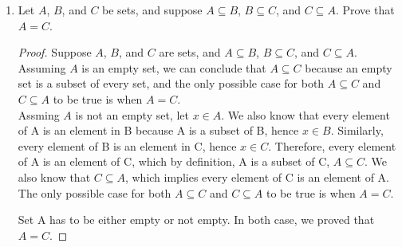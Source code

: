 \documentclass[12pt]{article}
\renewcommand\qedsymbol{$\blacksquare$}
\newenvironment{solution}
{\begin{proof}[Solution]\renewcommand\qedsymbol{$\square$}}
	{\end{proof}}
\begin{document}
\begin{enumerate}
\begin{solution}
		When $n=4$, $x^n= x^4$. Hence, we need to evaluate $\int_0^\infty x^4 e^{-x} dx$. Let $u=x^4 and dv=e^{-x}$, hence we will have $du= d(x^4) = 4x^3$ and $v = \int dv = -e^{-x} $. Using integration by parts, we will have:
	\begin{align*}
		&\int_0^\infty x^4 e^{-x} dx\\
		&= (-x^4 e^{-x} ) \bigg |_0^\infty - \int^\infty_0 -4x^3 e^{-x} dx \\
		&=(0+0) +  4 \int_0^\infty x^3 e^{-x} dx\\
	\end{align*}
	From the last integration, we know that $\int_0^\infty x^3 e^{-x} dx = 6$. Hence the result for $\int_0^\infty x^4 e^{-x} dx$ is $0+4 \times 6=24$.\\
	
		We can observe that when $n=0$, the value is $1=0!$, when $n=1$, the value is $1=1!$, when $n=2$, the value is $2=2!$, when $n=3$, the value is $6=3!$, and  when $n=4$, the value is $24=4!$.	Base on the pattens above, for an arbitary natural number $n$, the value of this integral will be $n!$ When $n=\frac{1}{2}$, the result is $\frac{\sqrt{\pi}}{2}.$ base on the calculator. It is surprising because using the integration, we found the way to evaluate factorial of a fraction(i.e. $\frac{1}{2}!=\frac{\sqrt{\pi}}{2}$).
	  \end{solution}
		
		
		
		
		\item
		Let $A$, $B$, and $C$ be sets, and suppose $A \subseteq B$, $B \subseteq C$, and $C \subseteq A$. Prove that $A = C$.
		\begin{proof}
			Suppose $A$, $B$, and $C$ are sets, and $A \subseteq B$, $B \subseteq C$, and $C \subseteq A$. \\Assuming $A$ is an empty set, we can conclude that $A \subseteq C$ because an empty set is a subset of every set, and the only possible case for both $A \subseteq C$ and $C \subseteq A$ to be true is when $A=C$.\\
			Assming $A$ is not an empty set, let $x \in A$. We also know that every element of A is an element in B because A is a subset of B, hence $x \in B$. Similarly, every element of B is an element in C, hence $x \in C$. Therefore, every element of A is an element of C, which by definition, A is a subset of C, $ A \subseteq C$. We also know that $ C \subseteq A$, which implies every element of C is an element of A. The only possible case for both $A \subseteq C$ and $C \subseteq A$ to be true is when $A=C$.
			
			Set A has to be either empty or not empty. In both case, we proved that $A=C$.
		
			\end{proof}
	\end{enumerate}
\end{document}
